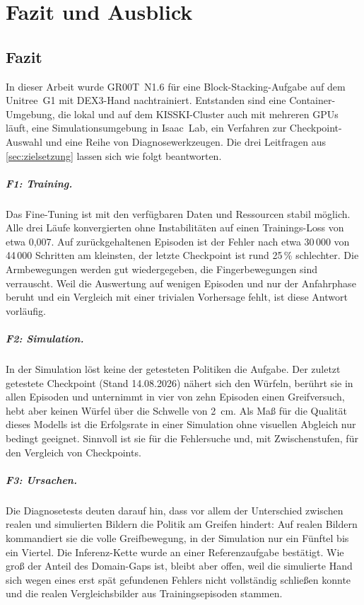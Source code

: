 
\chapter{Fazit und Ausblick}
\label{chap:fazit}

\section{Fazit}
\label{sec:fazit}

In dieser Arbeit wurde GR00T~N1.6 für eine Block-Stacking-Aufgabe auf dem
Unitree~G1 mit DEX3-Hand nachtrainiert. Entstanden sind eine
Container-Umgebung, die lokal und auf dem KISSKI-Cluster auch mit mehreren
GPUs läuft, eine Simulationsumgebung in Isaac~Lab, ein Verfahren zur
Checkpoint-Auswahl und eine Reihe von Diagnosewerkzeugen. Die drei Leitfragen
aus \cref{sec:zielsetzung} lassen sich wie folgt beantworten.

\paragraph{F1: Training.} Das Fine-Tuning ist mit den verfügbaren Daten und
Ressourcen stabil möglich. Alle drei Läufe konvergierten ohne Instabilitäten
auf einen Trainings-Loss von etwa 0,007. Auf zurückgehaltenen Episoden ist
der Fehler nach etwa 30\,000 von 44\,000 Schritten am kleinsten, der letzte
Checkpoint ist rund 25\,\% schlechter. Die Armbewegungen werden gut
wiedergegeben, die Fingerbewegungen sind verrauscht. Weil die Auswertung auf
wenigen Episoden und nur der Anfahrphase beruht und ein Vergleich mit einer
trivialen Vorhersage fehlt, ist diese Antwort vorläufig.

\paragraph{F2: Simulation.} In der Simulation löst keine der getesteten
Politiken die Aufgabe. Der zuletzt getestete Checkpoint (Stand 14.08.2026)
nähert sich den Würfeln, berührt sie in allen Episoden und unternimmt in vier
von zehn Episoden einen Greifversuch, hebt aber keinen Würfel über die
Schwelle von 2~cm. Als Maß für die Qualität dieses Modells ist die
Erfolgsrate in einer Simulation ohne visuellen Abgleich nur bedingt geeignet.
Sinnvoll ist sie für die Fehlersuche und, mit Zwischenstufen, für den
Vergleich von Checkpoints.

\paragraph{F3: Ursachen.} Die Diagnosetests deuten darauf hin, dass vor allem
der Unterschied zwischen realen und simulierten Bildern die Politik am Greifen
hindert: Auf realen Bildern kommandiert sie die volle Greifbewegung, in der
Simulation nur ein Fünftel bis ein Viertel. Die Inferenz-Kette wurde an einer
Referenzaufgabe bestätigt. Wie groß der Anteil des Domain-Gaps ist, bleibt
aber offen, weil die simulierte Hand sich wegen eines erst spät gefundenen
Fehlers nicht vollständig schließen konnte und die realen Vergleichsbilder
aus Trainingsepisoden stammen.

